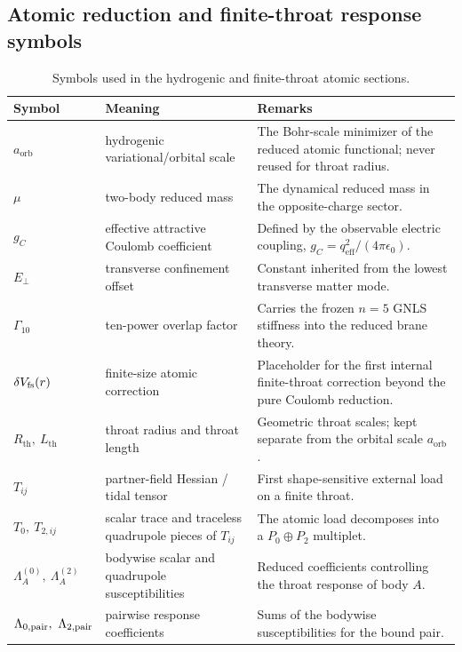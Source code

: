 \documentclass[11pt]{article}
\theoremstyle{plain}
\theoremstyle{definition}
\theoremstyle{remark}
\newcommand{\Rth}{R_{\mathrm{th}}}
\newcommand{\Lth}{L_{\mathrm{th}}}
\newcommand{\aorb}{a_{\mathrm{orb}}}
\newcommand{\qeff}{q_{\mathrm{eff}}}
\begin{document}
\subsection{Atomic reduction and finite-throat response symbols}\label{subsec:notation-ledger-atomic}

\begin{table}[t]
\centering
\caption{Symbols used in the hydrogenic and finite-throat atomic sections.}
\label{tab:notation-ledger-atomic}
\begin{tabularx}{\textwidth}{@{}>{\raggedright\arraybackslash}p{} >{\raggedright\arraybackslash}p{} X@{}}
\toprule
Symbol & Meaning & Remarks \\
\midrule
$\aorb$ & hydrogenic variational/orbital scale & The Bohr-scale minimizer of the reduced atomic functional; never reused for throat radius. \\
$\mu$ & two-body reduced mass & The dynamical reduced mass in the opposite-charge sector. \\
$g_C$ & effective attractive Coulomb coefficient & Defined by the observable electric coupling, $g_C=\qeff^2/(4\pi\epsilon_0)$. \\
$E_\perp$ & transverse confinement offset & Constant inherited from the lowest transverse matter mode. \\
$\Gamma_{10}$ & ten-power overlap factor & Carries the frozen $n=5$ GNLS stiffness into the reduced brane theory. \\
$\delta V_{\rm fs}(r)$ & finite-size atomic correction & Placeholder for the first internal finite-throat correction beyond the pure Coulomb reduction. \\
$\Rth,\ \Lth$ & throat radius and throat length & Geometric throat scales; kept separate from the orbital scale $\aorb$. \\
$T_{ij}$ & partner-field Hessian / tidal tensor & First shape-sensitive external load on a finite throat. \\
$T_0,\ T_{2,ij}$ & scalar trace and traceless quadrupole pieces of $T_{ij}$ & The atomic load decomposes into a $P_0\oplus P_2$ multiplet. \\
$\Lambda_A^{(0)},\ \Lambda_A^{(2)}$ & bodywise scalar and quadrupole susceptibilities & Reduced coefficients controlling the throat response of body $A$. \\
$\Lambda_{0,{\rm pair}},\ \Lambda_{2,{\rm pair}}$ & pairwise response coefficients & Sums of the bodywise susceptibilities for the bound pair. \\

\end{tabularx}
\end{table}
\end{document}
